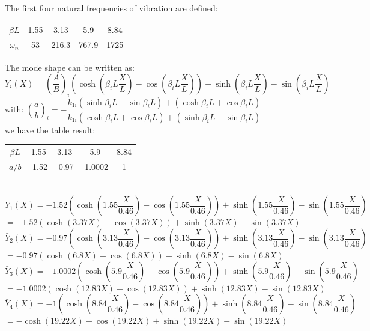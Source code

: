 \documentclass[14pt,a4paper]{article}
\begin{document}
\begin{enumerate}
	The first four natural frequencies of vibration are defined:
	\begin{center}
		\begin{tabular} {c c c c c}
			$\beta L$ & 1.55 & 3.13 & 5.9 & 8.84 \\
			$\omega_n$ & 53 & 216.3 & 767.9 & 1725
		\end{tabular}
	\end{center}
	The mode shape can be written as:\\
	$\bar{Y}_i(X) = \left(\dfrac{A}{B}\right)_i\left(\cosh(\beta_iL\dfrac{X}{L}) - \cos(\beta_iL\dfrac{X}L)\right) + \sinh(\beta_iL\dfrac{X}{L}) - \sin(\beta_iL\dfrac{X}{L})$\\
	with: 	$\left(\dfrac{a}{b}\right)_i = -\dfrac{k_{1i}(\sinh\beta_iL - \sin\beta_iL) + (\cosh\beta_iL + \cos\beta_iL)}{k_{1i}(\cosh\beta_iL + \cos\beta_iL) + (\sinh\beta_iL - \sin\beta_iL)}$\\
	we have the table result:
	\begin{tabular} {c c c c c}
		$\beta L$ & 1.55 & 3.13 & 5.9 & 8.84 \\
		$a/b$ & -1.52 & -0.97 & -1.0002 & 1
	\end{tabular}\\
	$\bar{Y}_1(X) = -1.52\left(\cosh(1.55\dfrac{X}{0.46}) - \cos(1.55\dfrac{X}{0.46})\right) + \sinh(1.55\dfrac{X}{0.46}) - \sin(1.55\dfrac{X}{0.46})$\\	
	\hspace*{0.9cm} $= -1.52\left(\cosh(3.37X) - \cos(3.37X)\right) + \sinh(3.37X) - \sin(3.37X)$\\	
	$\bar{Y}_2(X) = -0.97\left(\cosh(3.13\dfrac{X}{0.46}) - \cos(3.13\dfrac{X}{0.46})\right) + \sinh(3.13\dfrac{X}{0.46}) - \sin(3.13\dfrac{X}{0.46})$\\	
	\hspace*{0.9cm} $= -0.97\left(\cosh(6.8X) - \cos(6.8X)\right) + \sinh(6.8X) - \sin(6.8X)$\\
	$\bar{Y}_3(X) = -1.0002\left(\cosh(5.9\dfrac{X}{0.46}) - \cos(5.9\dfrac{X}{0.46})\right) + \sinh(5.9\dfrac{X}{0.46}) - \sin(5.9\dfrac{X}{0.46})$\\	
	\hspace*{0.9cm} $= -1.0002\left(\cosh(12.83X) - \cos(12.83X)\right) + \sinh(12.83X) - \sin(12.83X)$\\
	$\bar{Y}_4(X) = -1\left(\cosh(8.84\dfrac{X}{0.46}) - \cos(8.84\dfrac{X}{0.46})\right) + \sinh(8.84\dfrac{X}{0.46}) - \sin(8.84\dfrac{X}{0.46})$\\	
	\hspace*{0.9cm} $= -\cosh(19.22X) + \cos(19.22X) + \sinh(19.22X) - \sin(19.22X)$
	\pagebreak
	

\end{enumerate}
\end{document}
